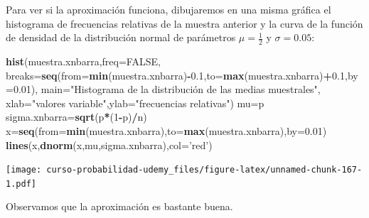 \documentclass[]{book}
\newenvironment{Shaded}{\begin{snugshade}}{\end{snugshade}}
\newcommand{\DataTypeTok}[1]{\textcolor[rgb]{0.13,0.29,0.53}{#1}}
\newcommand{\DecValTok}[1]{\textcolor[rgb]{0.00,0.00,0.81}{#1}}
\newcommand{\FloatTok}[1]{\textcolor[rgb]{0.00,0.00,0.81}{#1}}
\newcommand{\KeywordTok}[1]{\textcolor[rgb]{0.13,0.29,0.53}{\textbf{#1}}}
\newcommand{\NormalTok}[1]{#1}
\newcommand{\OperatorTok}[1]{\textcolor[rgb]{0.81,0.36,0.00}{\textbf{#1}}}
\newcommand{\OtherTok}[1]{\textcolor[rgb]{0.56,0.35,0.01}{#1}}
\newcommand{\StringTok}[1]{\textcolor[rgb]{0.31,0.60,0.02}{#1}}
\begin{document}
Para ver si la aproximación funciona, dibujaremos en una misma gráfica el histograma de frecuencias relativas de la muestra anterior y la curva de la función de densidad de la distribución normal de parámetros \(\mu =\frac{1}{2}\) y \(\sigma = 0.05\):

\begin{Shaded}
\begin{Highlighting}[]
\KeywordTok{hist}\NormalTok{(muestra.xnbarra,}\DataTypeTok{freq=}\OtherTok{FALSE}\NormalTok{,}
     \DataTypeTok{breaks=}\KeywordTok{seq}\NormalTok{(}\DataTypeTok{from=}\KeywordTok{min}\NormalTok{(muestra.xnbarra)}\OperatorTok{-}\FloatTok{0.1}\NormalTok{,}\DataTypeTok{to=}\KeywordTok{max}\NormalTok{(muestra.xnbarra)}\OperatorTok{+}\FloatTok{0.1}\NormalTok{,}\DataTypeTok{by=}\FloatTok{0.01}\NormalTok{),}
     \DataTypeTok{main=}\StringTok{"Histograma de la distribución de las medias muestrales"}\NormalTok{,}
     \DataTypeTok{xlab=}\StringTok{"valores variable"}\NormalTok{,}\DataTypeTok{ylab=}\StringTok{"frecuencias relativas"}\NormalTok{)}
\NormalTok{mu=p}
\NormalTok{sigma.xnbarra=}\KeywordTok{sqrt}\NormalTok{(p}\OperatorTok{*}\NormalTok{(}\DecValTok{1}\OperatorTok{-}\NormalTok{p)}\OperatorTok{/}\NormalTok{n)}
\NormalTok{x=}\KeywordTok{seq}\NormalTok{(}\DataTypeTok{from=}\KeywordTok{min}\NormalTok{(muestra.xnbarra),}\DataTypeTok{to=}\KeywordTok{max}\NormalTok{(muestra.xnbarra),}\DataTypeTok{by=}\FloatTok{0.01}\NormalTok{)}
\KeywordTok{lines}\NormalTok{(x,}\KeywordTok{dnorm}\NormalTok{(x,mu,sigma.xnbarra),}\DataTypeTok{col=}\StringTok{'red'}\NormalTok{)}
\end{Highlighting}
\end{Shaded}

\texttt{[image: curso-probabilidad-udemy\_files/figure-latex/unnamed-chunk-167-1.pdf]}

Observamos que la aproximación es bastante buena.


\end{document}
